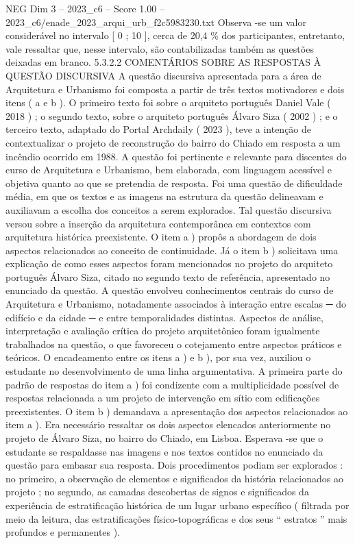 \begin{textsample}{NEG Dim 3 – 2023\_c6 – Score 1.00 – 2023\_c6/enade\_2023\_arqui\_urb\_f2c5983230.txt}
Observa -se um valor considerável no intervalo [ 0 ; 10 ], cerca de 20,4 \% dos participantes, entretanto, vale ressaltar que, nesse intervalo, são contabilizadas também as questões deixadas em branco. 5.3.2.2 COMENTÁRIOS SOBRE AS RESPOSTAS À QUESTÃO DISCURSIVA A questão discursiva apresentada para a área de Arquitetura e Urbanismo foi composta a partir de três textos motivadores e dois itens ( a e b ).
O primeiro texto foi sobre o arquiteto português Daniel Vale ( 2018 ) ; o segundo texto, sobre o arquiteto português Álvaro Siza ( 2002 ) ; e o terceiro texto, adaptado do Portal Archdaily ( 2023 ), teve a intenção de contextualizar o projeto de reconstrução do bairro do Chiado em resposta a um incêndio ocorrido em 1988.
A questão foi pertinente e relevante para discentes do curso de Arquitetura e Urbanismo, bem elaborada, com linguagem acessível e objetiva quanto ao que se pretendia de resposta.
Foi uma questão de dificuldade média, em que os textos e as imagens na estrutura da questão delineavam e auxiliavam a escolha dos conceitos a serem explorados.
Tal questão discursiva versou sobre a inserção da arquitetura contemporânea em contextos com arquitetura histórica preexistente.
O item a ) propôs a abordagem de dois aspectos relacionados ao conceito de continuidade.
Já o item b ) solicitava uma explicação de como esses aspectos foram mencionados no projeto do arquiteto português Álvaro Siza, citado no segundo texto de referência, apresentado no enunciado da questão.
A questão envolveu conhecimentos centrais do curso de Arquitetura e Urbanismo, notadamente associados à interação entre escalas {\EmojiFont ─} do edifício e da cidade {\EmojiFont ─} e entre temporalidades distintas.
Aspectos de análise, interpretação e avaliação crítica do projeto arquitetônico foram igualmente trabalhados na questão, o que favoreceu o cotejamento entre aspectos práticos e teóricos.
O encadeamento entre os itens a ) e b ), por sua vez, auxiliou o estudante no desenvolvimento de uma linha argumentativa.
A primeira parte do padrão de respostas do item a ) foi condizente com a multiplicidade possível de respostas relacionada a um projeto de intervenção em sítio com edificações preexistentes.
O item b ) demandava a apresentação dos aspectos relacionados ao item a ).
Era necessário ressaltar os dois aspectos elencados anteriormente no projeto de Álvaro Siza, no bairro do Chiado, em Lisboa.
Esperava -se que o estudante se respaldasse nas imagens e nos textos contidos no enunciado da questão para embasar sua resposta.
Dois procedimentos podiam ser explorados : no primeiro, a observação de elementos e significados da história relacionados ao projeto ; no segundo, as camadas descobertas de signos e significados da experiência de estratificação histórica de um lugar urbano específico ( filtrada por meio da leitura, das estratificações físico-topográficas e dos seus “ estratos ” mais profundos e permanentes ).

\end{textsample}
